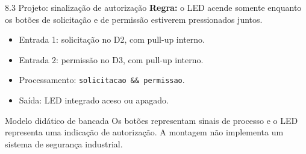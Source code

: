 \begin{frame}[t]{8.3 Projeto: sinalização de autorização}
\textbf{Regra:} o LED acende somente enquanto os botões de solicitação e de permissão estiverem pressionados juntos.
\begin{itemize}
\item Entrada 1: solicitação no D2, com pull-up interno.
\item Entrada 2: permissão no D3, com pull-up interno.
\item Processamento: \texttt{solicitacao \&\& permissao}.
\item Saída: LED integrado aceso ou apagado.
\end{itemize}
\begin{block}{Modelo didático de bancada}
Os botões representam sinais de processo e o LED representa uma indicação de autorização. A montagem não implementa um sistema de segurança industrial.
\end{block}
\end{frame}
